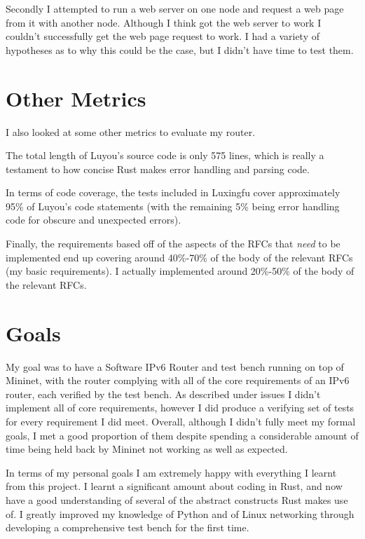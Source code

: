 \documentclass[12pt,a4paper,twoside,openany]{report}
\begin{document}
\bigskip

Secondly I attempted to run a web server on one node and request a web page from it with another node.  Although I think got the web server to work I couldn't successfully get the web page request to work.  I had a variety of hypotheses as to why this could be the case, but I didn't have time to test them.

\section{Other Metrics}

I also looked at some other metrics to evaluate my router. 

\bigskip

The total length of Luyou's source code is only 575 lines, which is really a testament to how concise Rust makes error handling and parsing code.

\bigskip

In terms of code coverage, the tests included in Luxingfu cover approximately 95\% of Luyou's code statements (with the remaining 5\% being error handling code for obscure and unexpected errors).

\bigskip

Finally, the requirements based off of the aspects of the RFCs that \textit{need} to be implemented end up covering around 40\%-70\% of the body of the relevant RFCs (my basic requirements). I actually implemented around 20\%-50\% of the body of the relevant RFCs.

\section{Goals}

My goal was to have a Software IPv6 Router and test bench running on top of Mininet, with the router complying with all of the core requirements of an IPv6 router, each verified by the test bench.  As described under issues I didn't implement all of core requirements, however I did produce a verifying set of tests for every requirement I did meet.  Overall, although I didn't fully meet my formal goals, I met a good proportion of them despite spending a considerable amount of time being held back by Mininet not working as well as expected.

\bigskip

In terms of my personal goals I am extremely happy with everything I learnt from this project.  I learnt a significant amount about coding in Rust, and now have a good understanding of several of the abstract constructs Rust makes use of.  I greatly improved my knowledge of Python and of Linux networking through developing a comprehensive test bench for the first time.
\end{document}
